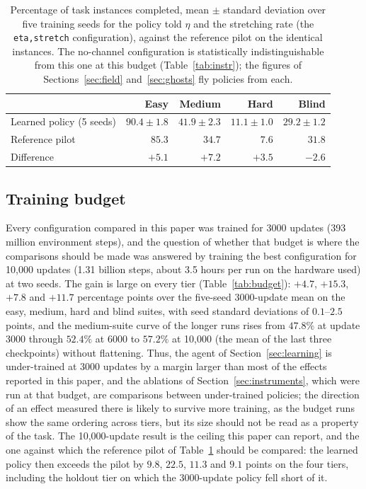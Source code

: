 \documentclass[11pt]{article}
\newcommand{\code}[1]{\texttt{\small #1}}
\begin{document}
\begin{table}[t]
\centering
\small
\begin{tabular}{lrrrr}
\toprule
& Easy & Medium & Hard & Blind \\
\midrule
Learned policy (5 seeds) & $90.4 \pm 1.8$ & $41.9 \pm 2.3$ & $11.1 \pm 1.0$ & $29.2 \pm 1.2$ \\
Reference pilot          & $85.3$ & $34.7$ & $7.6$ & $31.8$ \\
\midrule
Difference               & $+5.1$ & $+7.2$ & $+3.5$ & $-2.6$ \\
\bottomrule
\end{tabular}
\caption{Percentage of task instances completed, mean $\pm$ standard
deviation over five training seeds for the policy told $\eta$ and the
stretching rate (the \code{eta,stretch} configuration), against the
reference pilot on the identical instances. The no-channel configuration is
statistically indistinguishable from this one at this budget
(Table~\ref{tab:instr}); the figures of Sections~\ref{sec:field}
and~\ref{sec:ghosts} fly policies from each.}
\label{tab:main}
\end{table}

\subsection{Training budget}
\label{sec:budget}

Every configuration compared in this paper was trained for 3000 updates
(393 million environment steps), and the question of whether that budget is
where the comparisons should be made was answered by training the best
configuration for 10,000 updates (1.31 billion steps, about 3.5 hours per
run on the hardware used) at two seeds. The gain is large on every tier
(Table~\ref{tab:budget}): $+4.7$, $+15.3$, $+7.8$ and $+11.7$ percentage
points over the five-seed 3000-update mean on the easy, medium, hard and
blind suites, with seed standard deviations of $0.1$--$2.5$ points, and the
medium-suite curve of the longer runs rises from $47.8\%$ at update 3000
through $52.4\%$ at 6000 to $57.2\%$ at 10,000 (the mean of the last three
checkpoints) without flattening. Thus, the
agent of Section~\ref{sec:learning} is under-trained at 3000 updates by a
margin larger than most of the effects reported in this paper, and the
ablations of Section~\ref{sec:instruments}, which were run at that budget,
are comparisons between under-trained policies; the direction of an effect
measured there is likely to survive more training, as the budget runs show
the same ordering across tiers, but its size should not be read as a
property of the task. The 10,000-update result is the ceiling this paper
can report, and the one against which the reference pilot of
Table~\ref{tab:main} should be compared: the learned policy then exceeds the
pilot by $9.8$, $22.5$, $11.3$ and $9.1$ points on the four tiers, including
the holdout tier on which the 3000-update policy fell short of it.
\end{document}
